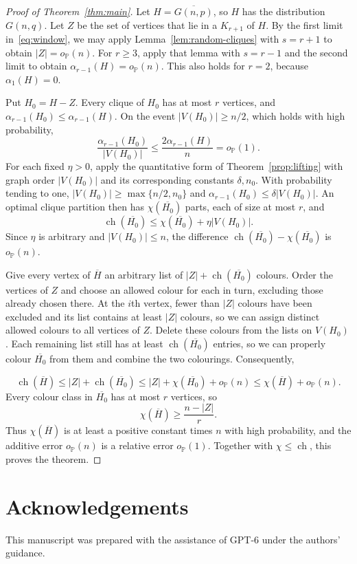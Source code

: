 \documentclass[11pt]{article}
\numberwithin{equation}{section}
\newcommand{\ch}{\operatorname{ch}}
\newcommand{\op}{o_{\mathbb P}}
\newcommand{\ov}[1]{\overline{#1}}
\begin{document}
\begin{proof}[Proof of Theorem~\ref{thm:main}]
Let $H=\ov{G(n,p)}$, so $H$ has the distribution $G(n,q)$. Let $Z$ be the set of vertices that lie in a $K_{r+1}$ of $H$. By the first limit in~\eqref{eq:window}, we may apply Lemma~\ref{lem:random-cliques} with $s=r+1$ to obtain $|Z|=\op(n)$. For $r\ge3$, apply that lemma with $s=r-1$ and the second limit to obtain $\alpha_{r-1}(H)=\op(n)$. This also holds for $r=2$, because $\alpha_1(H)=0$.

Put $H_0=H-Z$. Every clique of $H_0$ has at most $r$ vertices, and $\alpha_{r-1}(H_0)\le\alpha_{r-1}(H)$. On the event $|V(H_0)|\ge n/2$, which holds with high probability,
\[
 \frac{\alpha_{r-1}(H_0)}{|V(H_0)|}
 \le\frac{2\alpha_{r-1}(H)}n=\op(1).
\]
For each fixed $\eta>0$, apply the quantitative form of Theorem~\ref{prop:lifting} with graph order $|V(H_0)|$ and its corresponding constants $\delta,n_0$. With probability tending to one, $|V(H_0)|\ge\max\{n/2,n_0\}$ and $\alpha_{r-1}(H_0)\le\delta|V(H_0)|$. An optimal clique partition then has $\chi(\ov{H_0})$ parts, each of size at most $r$, and
\[
 \ch(\ov{H_0})\le\chi(\ov{H_0})+\eta|V(H_0)|.
\]
Since $\eta$ is arbitrary and $|V(H_0)|\le n$, the difference $\ch(\ov{H_0})-\chi(\ov{H_0})$ is $\op(n)$.

  
Give every vertex of $\ov H$ an arbitrary list of $|Z|+\ch(\ov{H_0})$ colours. Order the vertices of $Z$ and choose an allowed colour for each in turn, excluding those already chosen there. At the $i$th vertex, fewer than $|Z|$ colours have been excluded and its list contains at least $|Z|$ colours, so we can assign distinct allowed colours to all vertices of $Z$. Delete these colours from the lists on $V(H_0)$. Each remaining list still has at least $\ch(\ov{H_0})$ entries, so we can properly colour $\ov{H_0}$ from them and combine the two colourings. Consequently,
 
\[
 \ch(\ov H)\le |Z|+\ch(\ov{H_0})
 \le |Z|+\chi(\ov{H_0})+\op(n)
 \le\chi(\ov H)+\op(n).
\]
Every colour class in $\ov{H_0}$ has at most $r$ vertices, so
\[
 \chi(\ov H)\ge\frac{n-|Z|}{r}.
\]
Thus $\chi(\ov H)$ is at least a positive constant times $n$ with high probability, and the additive error $\op(n)$ is a relative error $\op(1)$. Together with $\chi\le\ch$, this proves the theorem.
\end{proof}
\section{Acknowledgements} This manuscript was prepared with the assistance of GPT-6 under the authors' guidance.
\end{document}
